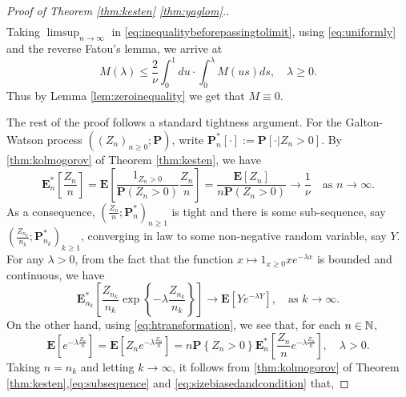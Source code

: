 \documentclass[12pt]{amsart}
\numberwithin{equation}{section}
\newcommand{\prob}{\mathbf P}
\newcommand{\brac}[1]{\left[ #1 \right]}
\newcommand{\set}[1]{\left\{ #1 \right\}}
\newcommand{\expct}{\mathbf E}
\begin{document}
\begin{proof}[Proof of Theorem \ref{thm:kesten} \eqref{thm:yaglom}.]
\begin{equation}
\begin{split}
\end{split}
\end{equation}
    Taking $\limsup_{n\to\infty}$ in
    \eqref{eq:inequalitybeforepassingtolimit}, using \eqref{eq:uniformly} and the reverse Fatou's lemma, we arrive at
\begin{equation*}
	    M(\lambda)
    \leq
        \frac{2}{\nu}\int_0^1du
    \cdot
    	\int_0^\lambda M(us)ds,
    \quad
    	\lambda\geq 0.
\end{equation*}
	Thus by Lemma \ref{lem:zeroinequality} we get that $M\equiv 0$.
\par
	The rest of the proof follows a standard tightness argument. 
	For the Galton-Watson process $((Z_n)_{n\ge 0};\prob)$, write $\prob_n^*[\cdot]:=\prob[\cdot|Z_n>0]$. 
	By \eqref{thm:kolmogorov} of Theorem \ref{thm:kesten}, we have
\begin{equation*}
	    \expct_n^*\brac{\frac{Z_n}{n}}
	=
	    \expct\brac{\frac{1_{Z_n>0}}{\prob(Z_n>0)}\frac{Z_n}{n}}
	=
	    \frac{\expct\brac{Z_n}}{n\prob(Z_n>0)}
    \to
        \frac{1}{\nu}
   \quad
		\text{as }n\to\infty.
\end{equation*}
	As a consequence, $(\frac{Z_n}{n};\prob_n^*)_{n\ge 1}$ is tight and there is some sub-sequence, say $(\frac{Z_{n_k}}{n_k};\prob_{n_k}^*)_{k\ge 1}$, converging in law to some non-negative random variable, say $Y$. 
	For any $\lambda > 0$, 
	from the fact that the function $x\mapsto 1_{x\geq 0}xe^{-\lambda x}$ is bounded and continuous, we have
\begin{equation}
\label{eq:subsequence}
	    \expct_{n_k}^*\brac{\frac{Z_{n_k}}{n_k}\exp\set{-\lambda\frac{Z_{n_k}}{n_k}}}
	\to
	    \expct\brac{Ye^{-\lambda Y}},
	\quad
		\text{as }k\to\infty.
\end{equation}
	On the other hand, using \eqref{eq:htransformation}, we see that, for each $n\in\mathbb N$,
\begin{equation}
\label{eq:sizebiasedandcondition}
	    \expct\brac{e^{-\lambda\frac{\dot Z_n}{n}}}
	=
	    \expct\brac{Z_n e^{-\lambda\frac{Z_n}{n}}}
	=
		n\prob\set{Z_n>0}\expct_n^*\brac{\frac{Z_n}{n}e^{-\lambda\frac{Z_n}{n}}},
	\quad
		\lambda > 0.
\end{equation}
	Taking $n=n_k$ and letting $k\to\infty$, it follows from \eqref{thm:kolmogorov} of Theorem \ref{thm:kesten},\eqref{eq:subsequence} and \eqref{eq:sizebiasedandcondition} that, 

\end{proof}
\end{document}
